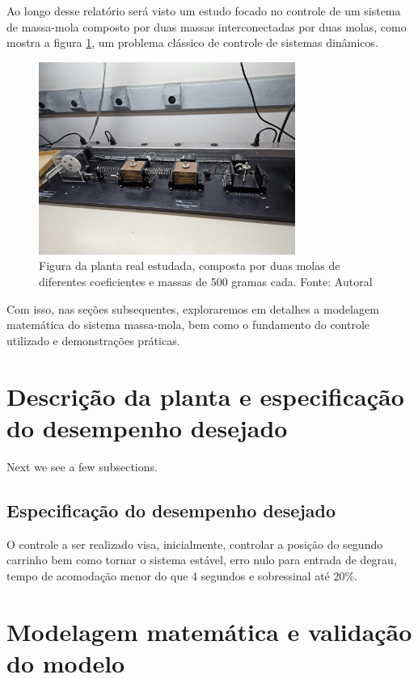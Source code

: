 \documentclass{ifacconf}
\begin{document}
Ao longo desse relatório será visto um estudo focado no controle de um sistema de massa-mola 
composto por duas massas interconectadas por duas molas, como mostra a figura \ref{fig:planta_padrao}, um problema
clássico de controle de sistemas dinâmicos. 

\begin{figure}[!htb]
  \begin{center}
  \includegraphics[width=8.4cm]{figures/planta_padrao.jpg}    %
  \caption{Figura da planta real estudada, composta por duas molas de diferentes coeficientes e massas de 500 gramas cada. Fonte: Autoral} 
  \label{fig:planta_padrao}
  \end{center}
\end{figure}

Com isso, nas seções subsequentes, exploraremos em detalhes a modelagem matemática do sistema
massa-mola, bem como o fundamento do controle utilizado e demonstrações práticas.

\section{Descrição da planta e especificação do desempenho desejado}

Next we see a few subsections.

\subsection{Especificação do desempenho desejado}

O controle a ser realizado visa, inicialmente, controlar a posição do segundo carrinho bem como tornar o sistema estável, erro nulo para entrada de degrau, 
tempo de acomodação menor do que 4 segundos e sobressinal até 20\%.

\section{Modelagem matemática e validação do modelo}
\end{document}
